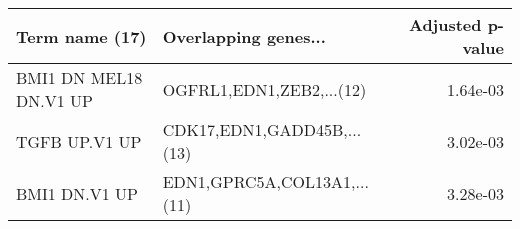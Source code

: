 \begin{tabular}{llr}
\toprule
        Term name (17) &        Overlapping genes... &  Adjusted p-value \\
\midrule
BMI1 DN MEL18 DN.V1 UP &    OGFRL1,EDN1,ZEB2,...(12) &          1.64e-03 \\
         TGFB UP.V1 UP &  CDK17,EDN1,GADD45B,...(13) &          3.02e-03 \\
         BMI1 DN.V1 UP & EDN1,GPRC5A,COL13A1,...(11) &          3.28e-03 \\
\bottomrule
\end{tabular}
